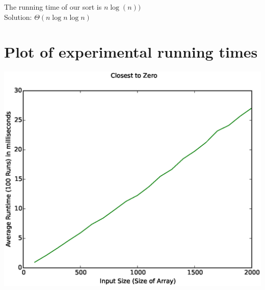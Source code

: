 \documentclass{article}
\begin{document}
The running time of our sort is $n \log(n))$\\

Solution: $\Theta(n \log n \log n)$

\section{Plot of experimental running times}

\includegraphics[width=\textwidth]{timings}
\end{document}
